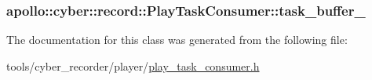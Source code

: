 \hypertarget{classapollo_1_1cyber_1_1record_1_1PlayTaskConsumer_acedbbb448f8819556afd8167db8b7b49}{
\subsubsection[{task\-\_\-buffer\-\_\-}]{ apollo\-::cyber\-::record\-::\-Play\-Task\-Consumer\-::task\-\_\-buffer\-\_\-\hspace{0.3cm}{\ttfamily [private]}}}\label{classapollo_1_1cyber_1_1record_1_1PlayTaskConsumer_acedbbb448f8819556afd8167db8b7b49}


The documentation for this class was generated from the following file\-:\begin{DoxyCompactItemize}
\item 
tools/cyber\-\_\-recorder/player/\hyperlink{play__task__consumer_8h}{play\-\_\-task\-\_\-consumer.\-h}\end{DoxyCompactItemize}
